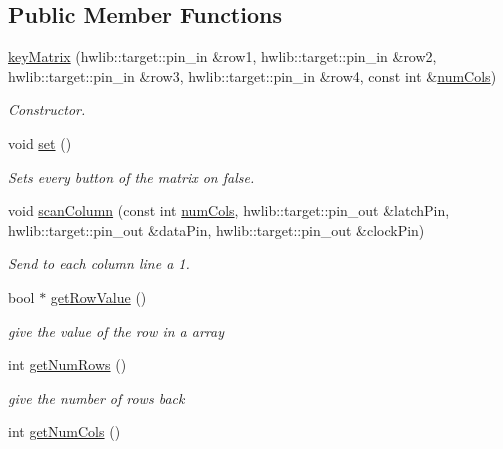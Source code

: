 \subsection*{Public Member Functions}
\begin{DoxyCompactItemize}
\item 
\hyperlink{classlight_music_1_1key_matrix_a20157eac9f3c3c056101178beeae5cc2}{key\+Matrix} (hwlib\+::target\+::pin\+\_\+in \&row1, hwlib\+::target\+::pin\+\_\+in \&row2, hwlib\+::target\+::pin\+\_\+in \&row3, hwlib\+::target\+::pin\+\_\+in \&row4, const int \&\hyperlink{classlight_music_1_1key_matrix_ab9fa44924cb5e674870f2602f92b39d3}{num\+Cols})
\begin{DoxyCompactList}\small\item\em Constructor. \end{DoxyCompactList}\item 
void \hyperlink{classlight_music_1_1key_matrix_ab14732662e5383219d953562dca72093}{set} ()
\begin{DoxyCompactList}\small\item\em Sets every button of the matrix on false. \end{DoxyCompactList}\item 
void \hyperlink{classlight_music_1_1key_matrix_a12c6a2c68f752505b080b9ec5a43601b}{scan\+Column} (const int \hyperlink{classlight_music_1_1key_matrix_ab9fa44924cb5e674870f2602f92b39d3}{num\+Cols}, hwlib\+::target\+::pin\+\_\+out \&latch\+Pin, hwlib\+::target\+::pin\+\_\+out \&data\+Pin, hwlib\+::target\+::pin\+\_\+out \&clock\+Pin)
\begin{DoxyCompactList}\small\item\em Send to each column line a 1. \end{DoxyCompactList}\item 
bool $\ast$ \hyperlink{classlight_music_1_1key_matrix_a11147e2bed1cc44d6127d23f6d1750be}{get\+Row\+Value} ()
\begin{DoxyCompactList}\small\item\em give the value of the row in a array \end{DoxyCompactList}\item 
int \hyperlink{classlight_music_1_1key_matrix_ac57a81f084a6eed8aea1db203ddebcbe}{get\+Num\+Rows} ()
\begin{DoxyCompactList}\small\item\em give the number of rows back \end{DoxyCompactList}\item 
int \hyperlink{classlight_music_1_1key_matrix_a26d5321912cf6eb7e4cb653ae52f2127}{get\+Num\+Cols} ()

\end{DoxyCompactItemize}
